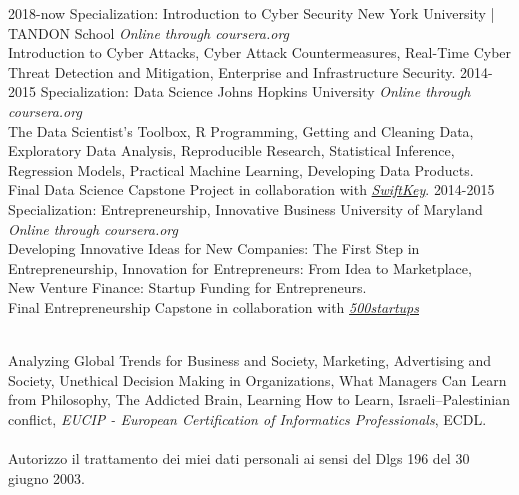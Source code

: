 \documentclass[]{friggeri-cv}
\begin{document}
\begin{entrylist}
\entry
    {2018-now}
    {Specialization: Introduction to Cyber Security}
    {New York University | TANDON School}
    {\emph{Online through coursera.org}\\
    Introduction to Cyber Attacks, Cyber Attack Countermeasures, Real-Time Cyber Threat Detection and Mitigation, Enterprise and Infrastructure Security.
    }
\entry
    {2014-2015}
    {Specialization: Data Science}
    {Johns Hopkins University}
    {\emph{Online through coursera.org}\\
    The Data Scientist’s Toolbox, R Programming, Getting and Cleaning Data, \\Exploratory Data Analysis, Reproducible Research, Statistical Inference, \\Regression Models, Practical Machine Learning, Developing Data Products.\\
    Final Data Science Capstone Project in collaboration with \emph{\href{http://swiftkey.com/it/}{SwiftKey}}.
    }
\entry
    {2014-2015}
    {Specialization: Entrepreneurship, Innovative Business}
    {University of Maryland}
    {\emph{Online through coursera.org}\\
    Developing Innovative Ideas for New Companies: The First Step in\\ Entrepreneurship, Innovation for Entrepreneurs: From Idea to Marketplace,\\ New Venture Finance: Startup Funding for Entrepreneurs. \\
    Final Entrepreneurship Capstone in collaboration with \emph{\href{http://500.co/startups}{500startups}}
    }
\end{entrylist}\\

Analyzing Global Trends for Business and Society, Marketing, Advertising and Society, Unethical Decision Making in Organizations, What Managers Can Learn from Philosophy, The Addicted Brain, Learning How to Learn, Israeli–Palestinian conflict, \emph{EUCIP - European Certification of Informatics Professionals}, ECDL.
\\ \\
Autorizzo il trattamento dei miei dati personali ai sensi del Dlgs 196 del 30 giugno 2003.
\end{document}

